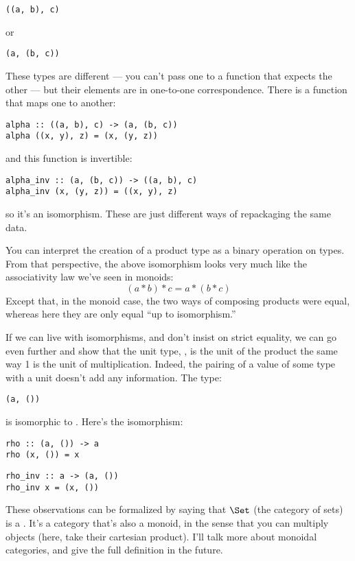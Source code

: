 \begin{Verbatim}
((a, b), c)
\end{Verbatim}
or

\begin{Verbatim}
(a, (b, c))
\end{Verbatim}
These types are different --- you can't pass one to a function that
expects the other --- but their elements are in one-to-one
correspondence. There is a function that maps one to another:

\begin{Verbatim}
alpha :: ((a, b), c) -> (a, (b, c))
alpha ((x, y), z) = (x, (y, z))
\end{Verbatim}
and this function is invertible:

\begin{Verbatim}
alpha_inv :: (a, (b, c)) -> ((a, b), c)
alpha_inv (x, (y, z)) = ((x, y), z)
\end{Verbatim}
so it's an isomorphism. These are just different ways of repackaging the
same data.

You can interpret the creation of a product type as a binary operation
on types. From that perspective, the above isomorphism looks very much
like the associativity law we've seen in monoids:
\[(a * b) * c = a * (b * c)\]
Except that, in the monoid case, the two ways of composing products were
equal, whereas here they are only equal ``up to isomorphism.''

If we can live with isomorphisms, and don't insist on strict equality,
we can go even further and show that the unit type, \code{()}, is the
unit of the product the same way 1 is the unit of multiplication.
Indeed, the pairing of a value of some type  with a unit
doesn't add any information. The type:

\begin{Verbatim}
(a, ())
\end{Verbatim}
is isomorphic to . Here's the isomorphism:

\begin{Verbatim}
rho :: (a, ()) -> a
rho (x, ()) = x
\end{Verbatim}

\begin{Verbatim}
rho_inv :: a -> (a, ())
rho_inv x = (x, ())
\end{Verbatim}
These observations can be formalized by saying that $\Set$ (the
category of sets) is a . It's a category that's
also a monoid, in the sense that you can multiply objects (here, take
their cartesian product). I'll talk more about monoidal categories, and
give the full definition in the future.

